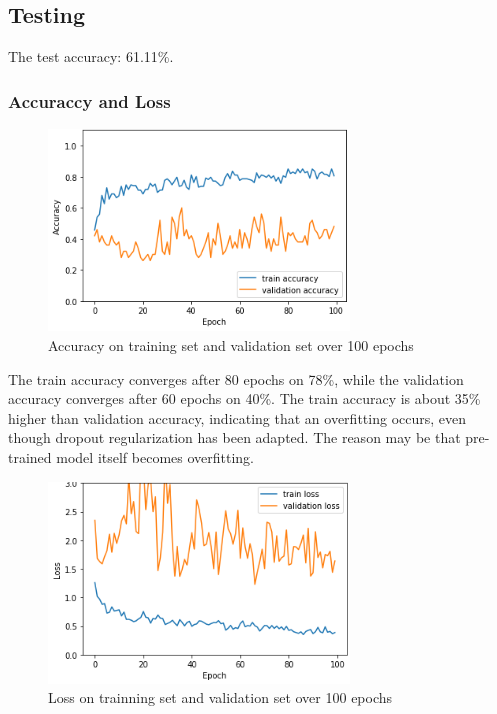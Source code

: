 \documentclass[a4paper,10pt]{article}
\begin{document}
\subsection{Testing}

The test accuracy: 61.11\%.

\subsubsection{Accuraccy and Loss}
\begin{figure}[H]
  \centering
  \includegraphics[width=8cm]{./images/ResNet50V2-accuracy.png}
     \caption{Accuracy on training set and validation set over 100 epochs}
        \label{task2-loss}
\end{figure}

The train accuracy converges after 80 epochs on 78\%, 
while the validation accuracy converges after 60 epochs on 40\%.
The train accuracy is about 35\% higher than validation accuracy, 
indicating that an overfitting occurs, 
even though dropout regularization has been adapted. 
The reason may be that pre-trained model itself becomes overfitting.

\begin{figure}[H]
  \centering
  \includegraphics[width=8cm]{./images/ResNet50V2-loss.png}
     \caption{Loss on trainning set and validation set over 100 epochs}
        \label{task2-loss}
\end{figure}
\end{document}
